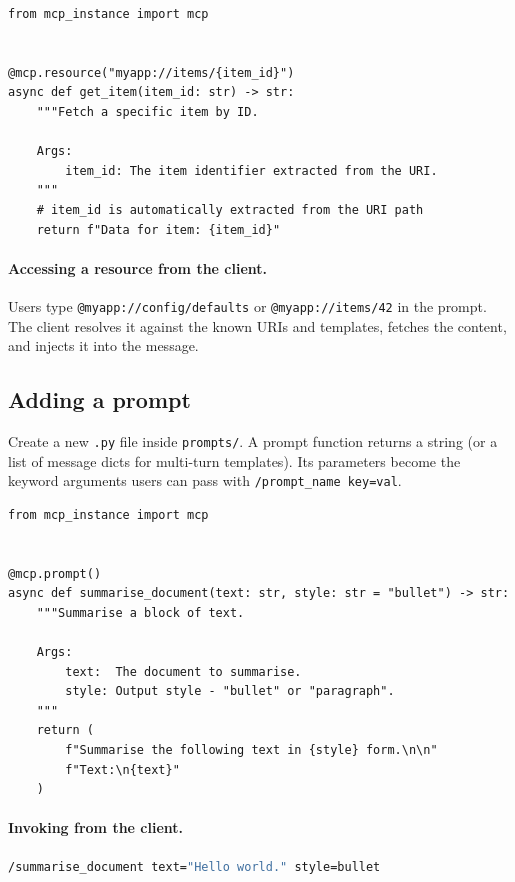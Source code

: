 \documentclass[11pt, a4paper]{article}
\begin{document}
\begin{lstlisting}[caption={resources/my\_template\_resource.py --- URI template}]
from mcp_instance import mcp


@mcp.resource("myapp://items/{item_id}")
async def get_item(item_id: str) -> str:
    """Fetch a specific item by ID.

    Args:
        item_id: The item identifier extracted from the URI.
    """
    # item_id is automatically extracted from the URI path
    return f"Data for item: {item_id}"
\end{lstlisting}

\paragraph{Accessing a resource from the client.}
Users type \texttt{@myapp://config/defaults} or \texttt{@myapp://items/42} in the prompt. The client resolves it against the known URIs and templates, fetches the content, and injects it into the message.

\subsection{Adding a prompt}

Create a new \texttt{.py} file inside \texttt{prompts/}. A prompt function returns a string (or a list of message dicts for multi-turn templates). Its parameters become the keyword arguments users can pass with \texttt{/prompt\_name key=val}.

\begin{lstlisting}[caption={prompts/my\_prompt.py}]
from mcp_instance import mcp


@mcp.prompt()
async def summarise_document(text: str, style: str = "bullet") -> str:
    """Summarise a block of text.

    Args:
        text:  The document to summarise.
        style: Output style - "bullet" or "paragraph".
    """
    return (
        f"Summarise the following text in {style} form.\n\n"
        f"Text:\n{text}"
    )
\end{lstlisting}

\paragraph{Invoking from the client.}
\begin{lstlisting}[language=bash, style=python, numbers=none]
/summarise_document text="Hello world." style=bullet
\end{lstlisting}
\end{document}
